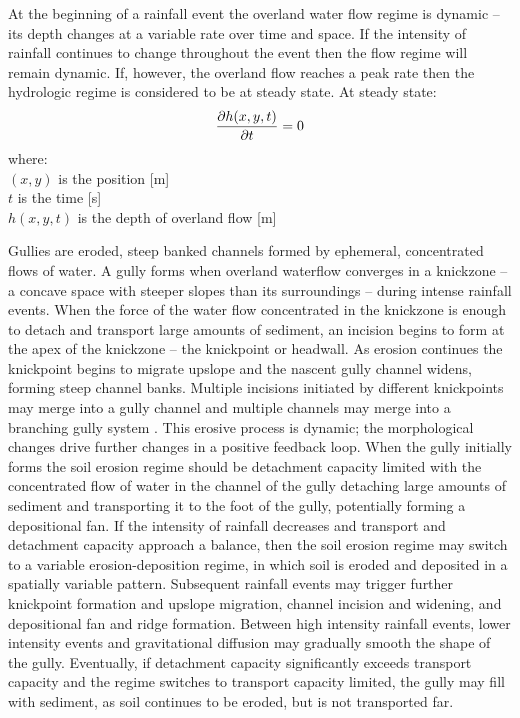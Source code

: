 \documentclass[gmd, manuscript]{copernicus}
\begin{document}
At the beginning of a rainfall event 
the overland water flow regime is dynamic -- 
its depth changes at a variable rate over time and space. 
If the intensity of rainfall continues to change throughout the event
then the flow regime will remain dynamic. 
If, however, the overland flow reaches a peak rate
then the hydrologic regime is considered to be at steady state.
At steady state:
\begin{equation}
\label{eq:steady_state}
{\partial h(x,y,t) \over \partial t} = 0
\end{equation}
%
{\small
\noindent
where: \\
\noindent
\hspace*{0.5em} $(x,y)$ is the position [\unit{m}]\\
\hspace*{0.5em} $t$ is the time [\unit{s}]\\
\hspace*{0.5em} $h(x,y,t)$ is the depth of overland flow [\unit{m}]\\
}

Gullies are eroded, steep banked channels 
formed by ephemeral, concentrated flows of water.
A gully forms when overland waterflow
converges in a knickzone
-- a concave space with steeper slopes than its surroundings 
\citep{Zahra2017} -- 
during intense rainfall events.  
When the force of the water flow concentrated in the knickzone
is enough to detach and transport large amounts of sediment,
an incision begins to form at the apex of the knickzone 
-- the knickpoint or headwall.
As erosion continues the knickpoint begins to migrate upslope
and the nascent gully channel widens,
forming steep channel banks. 
Multiple incisions initiated by different knickpoints 
may merge into a gully channel
and multiple channels may merge 
into a branching gully system \citep{Mitasova2013}. 
This erosive process is dynamic; 
the morphological changes drive further changes 
in a positive feedback loop.
When the gully initially forms 
the soil erosion regime should be detachment capacity limited
with the concentrated flow of water in the channel of the gully 
detaching large amounts of sediment 
and transporting it to the foot of the gully, 
potentially forming a depositional fan.
If the intensity of rainfall decreases
and transport and detachment capacity 
approach a balance, 
then the soil erosion regime may switch to 
a variable erosion-deposition regime,
in which soil is eroded and deposited 
in a spatially variable pattern.
Subsequent rainfall events may trigger further 
knickpoint formation and upslope migration, 
channel incision and widening, and
depositional fan and ridge formation. 
Between high intensity rainfall events, 
lower intensity events and gravitational diffusion
may gradually smooth the shape of the gully. 
Eventually, if detachment capacity 
significantly exceeds transport capacity
and the regime switches to transport capacity limited, 
the gully may fill with sediment,
as soil continues to be eroded, but is not transported far. 
\end{document}
